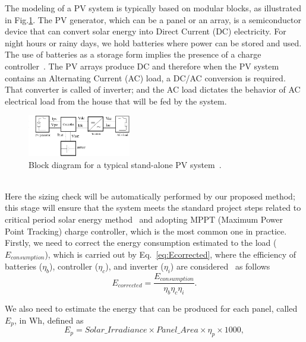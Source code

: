 \documentclass[10pt,conference]{IEEEtran}
\begin{document}
The modeling of a PV system is typically based on modular blocks, as illustrated in Fig.\ref{fig:blockdiagram}. %
The PV generator, which can be a panel or an array, is a semiconductor device that can convert solar energy into Direct Current (DC) electricity. %
For night hours or rainy days, we hold batteries where power can be stored and used. The use of batteries as a storage form implies the presence of a charge controller~\cite{Hansen}. The PV arrays produce DC and therefore when the PV system contains an Alternating Current (AC) load, a DC/AC conversion is required. That converter is called of inverter; and the AC load dictates the behavior of AC electrical load from the house that will be fed by the system.
\begin{figure}[h]
\includegraphics[width=0.4\textwidth]{blockdiagramPVS2_rev}
\centering
\caption{Block diagram for a typical stand-alone PV system~\cite{Hansen}.}
\label{fig:blockdiagram} 
\end{figure}
\\
%
Here the sizing check will be automatically performed by our proposed method; this stage will ensure that the system meets the standard project steps related to critical period solar energy method~\cite{Pinho} and adopting MPPT (Maximum Power Point Tracking) charge controller, which is the most common one in practice. 
%
Firstly, we need to correct the energy consumption estimated to the load ($E_{consumption}$), which is carried out by Eq.~\eqref{eq:Ecorrected}, where the efficiency of batteries ($\eta_{b}$), controller ($\eta_{c}$), and inverter ($\eta_{i}$) are considered~\cite{Pinho} as follows
\begin{equation}
\label{eq:Ecorrected}
\scriptstyle E_{corrected} = \dfrac{\scriptstyle E_{consumption}}{ \scriptstyle \eta_{b} \eta_{c} \eta_{i} }.
\end{equation}

We also need to estimate the energy that can be produced for each panel, called $E_{p}$, in Wh, defined as
%
\begin{equation}
\label{eq:Ep}
\scriptstyle E_{p} = \scriptstyle Solar\_Irradiance \times Panel\_Area \times \eta_{p} \times 1000,
\end{equation}
\end{document}
